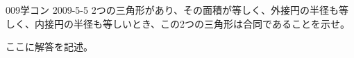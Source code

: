 \begin{thm}{009}{}{学コン 2009-5-5}
 2つの三角形があり、その面積が等しく、外接円の半径も等しく、内接円の半径も等しいとき、この2つの三角形は合同であることを示せ。
\end{thm}

ここに解答を記述。
